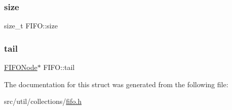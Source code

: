 \hypertarget{structFIFO_a29f539fa6ee65c7b230588f7a1928d82}{}\label{structFIFO_a29f539fa6ee65c7b230588f7a1928d82} 
\subsubsection{\texorpdfstring{size}{size}}
{\footnotesize\ttfamily size\+\_\+t F\+I\+F\+O\+::size}

\hypertarget{structFIFO_aca03b48cff8af692bed09691e5e7f9e7}{}\label{structFIFO_aca03b48cff8af692bed09691e5e7f9e7} 
\subsubsection{\texorpdfstring{tail}{tail}}
{\footnotesize\ttfamily \hyperlink{structFIFONode}{F\+I\+F\+O\+Node}$\ast$ F\+I\+F\+O\+::tail}



The documentation for this struct was generated from the following file\+:\begin{DoxyCompactItemize}
\item 
src/util/collections/\hyperlink{fifo_8h}{fifo.\+h}\end{DoxyCompactItemize}
